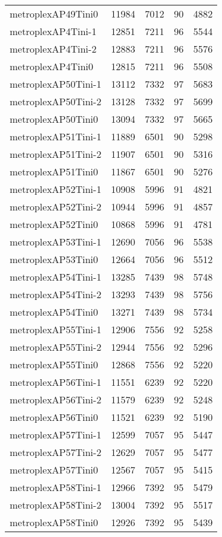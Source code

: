 \begin{longtable}{lrrrr}
metroplexAP49Tini0 & 11984 & 7012 & 90 & 4882 \\
metroplexAP4Tini-1 & 12851 & 7211 & 96 & 5544 \\
metroplexAP4Tini-2 & 12883 & 7211 & 96 & 5576 \\
metroplexAP4Tini0 & 12815 & 7211 & 96 & 5508 \\
metroplexAP50Tini-1 & 13112 & 7332 & 97 & 5683 \\
metroplexAP50Tini-2 & 13128 & 7332 & 97 & 5699 \\
metroplexAP50Tini0 & 13094 & 7332 & 97 & 5665 \\
metroplexAP51Tini-1 & 11889 & 6501 & 90 & 5298 \\
metroplexAP51Tini-2 & 11907 & 6501 & 90 & 5316 \\
metroplexAP51Tini0 & 11867 & 6501 & 90 & 5276 \\
metroplexAP52Tini-1 & 10908 & 5996 & 91 & 4821 \\
metroplexAP52Tini-2 & 10944 & 5996 & 91 & 4857 \\
metroplexAP52Tini0 & 10868 & 5996 & 91 & 4781 \\
metroplexAP53Tini-1 & 12690 & 7056 & 96 & 5538 \\
metroplexAP53Tini0 & 12664 & 7056 & 96 & 5512 \\
metroplexAP54Tini-1 & 13285 & 7439 & 98 & 5748 \\
metroplexAP54Tini-2 & 13293 & 7439 & 98 & 5756 \\
metroplexAP54Tini0 & 13271 & 7439 & 98 & 5734 \\
metroplexAP55Tini-1 & 12906 & 7556 & 92 & 5258 \\
metroplexAP55Tini-2 & 12944 & 7556 & 92 & 5296 \\
metroplexAP55Tini0 & 12868 & 7556 & 92 & 5220 \\
metroplexAP56Tini-1 & 11551 & 6239 & 92 & 5220 \\
metroplexAP56Tini-2 & 11579 & 6239 & 92 & 5248 \\
metroplexAP56Tini0 & 11521 & 6239 & 92 & 5190 \\
metroplexAP57Tini-1 & 12599 & 7057 & 95 & 5447 \\
metroplexAP57Tini-2 & 12629 & 7057 & 95 & 5477 \\
metroplexAP57Tini0 & 12567 & 7057 & 95 & 5415 \\
metroplexAP58Tini-1 & 12966 & 7392 & 95 & 5479 \\
metroplexAP58Tini-2 & 13004 & 7392 & 95 & 5517 \\
metroplexAP58Tini0 & 12926 & 7392 & 95 & 5439 \\

\end{longtable}

